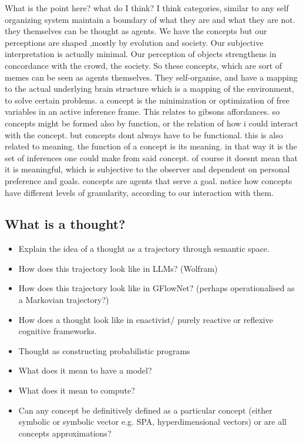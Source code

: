What is the point here? what do I think? I think categories, similar to any self organizing system maintain a boundary of what they are and what they are not. they themselves can be thought as agents. We have the concepts but our perceptions are shaped ,mostly by evolution and society. Our subjective interpretation is actually minimal. Our perception of objects strengthens in concordance with the crowd, the society. So these concepts, which are sort of memes can be seen as agents themselves. They self-organise, and have a mapping to the actual underlying brain structure which is a mapping of the environment, to solve certain problems. a concept is the minimization or optimization of free variables in an active inference frame. This relates to gibsons affordances. so concepts might be formed also by function, or the relation of how i could interact with the concept. but concepts dont always have to be functional. this is also related to meaning. the function of a concept is its meaning. in that way it is the set of inferences one could make from said concept. of course it doesnt mean that it is meaningful, which is subjective to the observer and dependent on personal preference and goals. concepts are agents that serve a goal. notice how concepts have different levels of granularity, according to our interaction with them. 


\subsection{What is a thought?}
\begin{itemize}
    \item Explain the idea of a thought as a trajectory through semantic space. 
    \item How does this trajectory look like in LLMs? (Wolfram)
    \item How does this trajectory look like in GFlowNet? (perhaps operationalised as a Markovian trajectory?)
    \item How does a thought look like in enactivist/ purely reactive or reflexive cognitive frameworks. 
    \item Thought as constructing probabilistic programs
    \item What does it mean to have a model?
    \item What does it mean to compute?
    \item Can any concept be definitively defined as a particular concept (either symbolic or symbolic vector e.g. SPA, hyperdimensional vectors) or are all concepts approximations?
\end{itemize}


